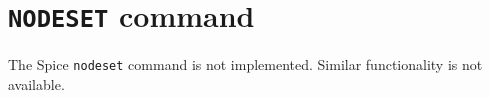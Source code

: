 %
%
%
%
\section{{\tt NODESET} command}
The Spice {\tt nodeset} command is not implemented.  Similar
functionality is not available.
